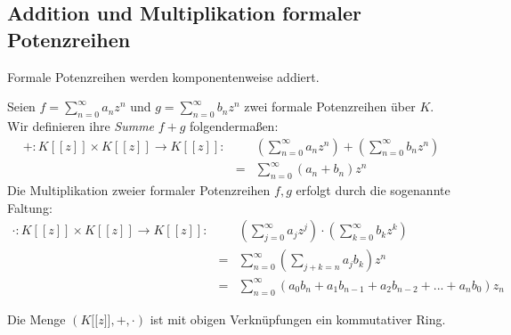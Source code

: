 \subsection{Addition und Multiplikation formaler Potenzreihen} \label{Rechnen}
Formale Potenzreihen werden komponentenweise addiert.
%
%
%
%
\begin{defn}\label{AdditionMultiplikationPotenzreihen}
%
Seien $f = \sum_{n=0}^\infty a_n z^n$ und $g = \sum_{n=0}^\infty b_n z^n$ zwei formale Potenzreihen über $K$. Wir definieren ihre \textit{Summe} $f+g$ folgendermaßen:
\begin{eqnarray*}
+ \colon K [[z]] \times K [[z]] \to K[[z]]:&&\left( \sum_{n=0}^\infty a_n z^n \right) + \left( \sum_{n=0}^\infty b_n z^n \right) \\
&=& \sum_{n=0}^{\infty} (a_n + b_n) z^n 
\end{eqnarray*}
%
%
% 
%
%
Die Multiplikation zweier formaler Potenzreihen $f,g$ erfolgt durch die sogenannte Faltung:
\begin{eqnarray*}
\cdot\colon  K [[z]] \times K [[z]] \to K[[z]]:&& \left( \sum_{j=0}^\infty a_j z^j \right)\cdot \left( \sum_{k=0}^\infty b_k z^k \right) \\
&=& \sum_{n=0}^\infty \left(\sum_{j+k=n} a_j b_k\right) z^n \\
&=& \sum_{n= 0}^\infty \left(a_0b_n + a_1b_{n-1} + a_2b_{n-2} + ... + a_nb_0 \right)z_n
\end{eqnarray*}
\end{defn}
%
\vspace{0.8cm}
%
%
%
% 
%
\begin{satz}\label{RingFormalerPR}
Die Menge $\left(K\lbrack\lbrack z\rbrack\rbrack, +, \cdot\right)$ ist mit obigen Verknüpfungen ein kommutativer Ring.
\end{satz}
